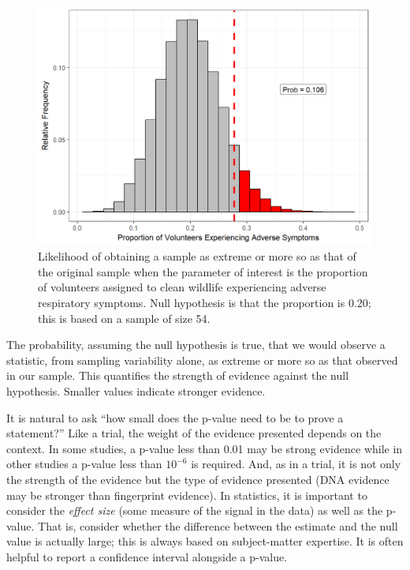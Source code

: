 \documentclass[]{book}
\theoremstyle{plain}
\theoremstyle{mydefn}
\theoremstyle{myexmpl}
\theoremstyle{remark}
\let\BeginKnitrBlock\begin \let\EndKnitrBlock\end
\let\BeginKnitrBlock\begin \let\EndKnitrBlock\end
\begin{document}
\begin{figure}

{\centering \includegraphics[width=0.8\linewidth]{./Images/nulldistns-deepwater-pvalue-1} 

}

\caption{Likelihood of obtaining a sample as extreme or more so as that of the original sample when the parameter of interest is the proportion of volunteers assigned to clean wildlife experiencing adverse respiratory symptoms.  Null hypothesis is that the proportion is 0.20; this is based on a sample of size 54.}\label{fig:nulldistns-deepwater-pvalue}
\end{figure}

\BeginKnitrBlock{definition}[P-Value]
\protect\hypertarget{def:defn-pvalue}{}{\label{def:defn-pvalue}
{} }The probability, assuming the null hypothesis
is true, that we would observe a statistic, from sampling variability
alone, as extreme or more so as that observed in our sample. This
quantifies the strength of evidence against the null hypothesis. Smaller
values indicate stronger evidence.
\EndKnitrBlock{definition}

It is natural to ask ``how small does the p-value need to be to prove a
statement?'' Like a trial, the weight of the evidence presented depends
on the context. In some studies, a p-value less than 0.01 may be strong
evidence while in other studies a p-value less than \(10^{-6}\) is
required. And, as in a trial, it is not only the strength of the
evidence but the type of evidence presented (DNA evidence may be
stronger than fingerprint evidence). In statistics, it is important to
consider the \emph{effect size} (some measure of the signal in the data)
as well as the p-value. That is, consider whether the difference between
the estimate and the null value is actually large; this is always based
on subject-matter expertise. It is often helpful to report a confidence
interval alongside a p-value.
\end{document}
